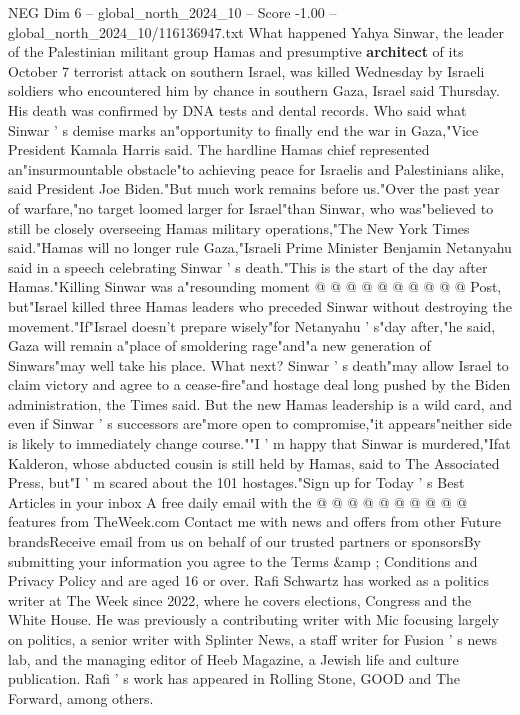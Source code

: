 \begin{textsample}{NEG Dim 6 – global\_north\_2024\_10 – Score -1.00 – global\_north\_2024\_10/116136947.txt}  \label{ex:f6_neg_052}
What happened Yahya Sinwar, the leader of the Palestinian militant group Hamas and presumptive \textbf{architect} of its October 7 terrorist attack on southern Israel, was killed Wednesday by Israeli soldiers who encountered him by chance in southern Gaza, Israel said Thursday.
His death was confirmed by DNA tests and dental records.
Who said what Sinwar ' s demise marks an"opportunity to finally end the war in Gaza,"Vice President Kamala Harris said.
The hardline Hamas chief represented an"insurmountable obstacle"to achieving peace for Israelis and Palestinians alike, said President Joe Biden."But much work remains before us."Over the past year of warfare,"no target loomed larger for Israel"than Sinwar, who was"believed to still be closely overseeing Hamas military operations,"The New York Times said."Hamas will no longer rule Gaza,"Israeli Prime Minister Benjamin Netanyahu said in a speech celebrating Sinwar ' s death."This is the start of the day after Hamas."Killing Sinwar was a"resounding moment @ @ @ @ @ @ @ @ @ @ Post, but"Israel killed three Hamas leaders who preceded Sinwar without destroying the movement."If"Israel doesn't prepare wisely"for Netanyahu ' s"day after,"he said, Gaza will remain a"place of smoldering rage"and"a new generation of Sinwars"may well take his place.
What next?
Sinwar ' s death"may allow Israel to claim victory and agree to a cease-fire"and hostage deal long pushed by the Biden administration, the Times said.
But the new Hamas leadership is a wild card, and even if Sinwar ' s successors are"more open to compromise,"it appears"neither side is likely to immediately change course.""I ' m happy that Sinwar is murdered,"Ifat Kalderon, whose abducted cousin is still held by Hamas, said to The Associated Press, but"I ' m scared about the 101 hostages."Sign up for Today ' s Best Articles in your inbox A free daily email with the @ @ @ @ @ @ @ @ @ @ features from TheWeek.com Contact me with news and offers from other Future brandsReceive email from us on behalf of our trusted partners or sponsorsBy submitting your information you agree to the Terms \&amp ; Conditions and Privacy Policy and are aged 16 or over.
Rafi Schwartz has worked as a politics writer at The Week since 2022, where he covers elections, Congress and the White House.
He was previously a contributing writer with Mic focusing largely on politics, a senior writer with Splinter News, a staff writer for Fusion ' s news lab, and the managing editor of Heeb Magazine, a Jewish life and culture publication.
Rafi ' s work has appeared in Rolling Stone, GOOD and The Forward, among others.

\end{textsample}
